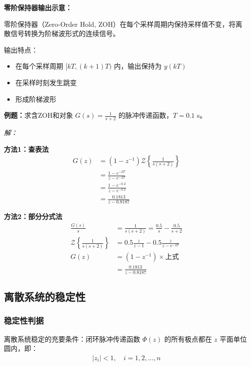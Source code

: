 \begin{minipage}[t]{0.45\textwidth}
\vspace{0pt}
\textbf{零阶保持器输出示意：}

零阶保持器（Zero-Order Hold, ZOH）在每个采样周期内保持采样值不变，将离散信号转换为阶梯波形式的连续信号。

输出特点：
\begin{itemize}
    \item 在每个采样周期 $[kT, (k+1)T)$ 内，输出保持为 $y(kT)$
    \item 在采样时刻发生跳变
    \item 形成阶梯波形
\end{itemize}

\vspace{0.5cm}
\textbf{例题：}求含ZOH和对象 $G(s) = \frac{1}{s+2}$ 的脉冲传递函数，$T = 0.1$ s。

\textit{解：}

\textbf{方法1：查表法}
\begin{align*}
G(z) &= (1-z^{-1})\mathcal{Z}\left\{\frac{1}{s(s+2)}\right\} \\
&= \frac{1-e^{-2T}}{z-e^{-2T}} \\
&= \frac{1-e^{-0.2}}{z-e^{-0.2}} \\
&= \frac{0.1813}{z-0.8187}
\end{align*}

\textbf{方法2：部分分式法}
\begin{align*}
\frac{G(s)}{s} &= \frac{1}{s(s+2)} = \frac{0.5}{s} - \frac{0.5}{s+2} \\
\mathcal{Z}\left\{\frac{1}{s(s+2)}\right\} &= 0.5\frac{z}{z-1} - 0.5\frac{z}{z-e^{-2T}} \\
G(z) &= (1-z^{-1}) \times \text{上式} \\
&= \frac{0.1813}{z-0.8187}
\end{align*}
\end{minipage}

\subsection{离散系统的稳定性}

\subsubsection{稳定性判据}

离散系统稳定的充要条件：闭环脉冲传递函数 $\Phi(z)$ 的所有极点都在 $z$ 平面单位圆内，即：
\begin{align*}
|z_i| < 1, \quad i = 1, 2, \ldots, n
\end{align*}

